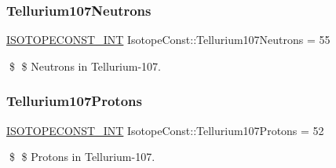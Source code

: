 \subsubsection{\texorpdfstring{Tellurium107\+Neutrons}{Tellurium107Neutrons}}
{\footnotesize\ttfamily \mbox{\hyperlink{group___isotope_const-_macros_ga5f18360b3e99483a35c32d789e62621c}{I\+S\+O\+T\+O\+P\+E\+C\+O\+N\+S\+T\+\_\+\+I\+NT}} Isotope\+Const\+::\+Tellurium107\+Neutrons = 55}

\$ \$ Neutrons in Tellurium-\/107. \mbox{\label{group___isotope_const-_tellurium-_te107_gac4f8b073d845bb260dca28fe83b9511e}} 
\subsubsection{\texorpdfstring{Tellurium107\+Protons}{Tellurium107Protons}}
{\footnotesize\ttfamily \mbox{\hyperlink{group___isotope_const-_macros_ga5f18360b3e99483a35c32d789e62621c}{I\+S\+O\+T\+O\+P\+E\+C\+O\+N\+S\+T\+\_\+\+I\+NT}} Isotope\+Const\+::\+Tellurium107\+Protons = 52}

\$ \$ Protons in Tellurium-\/107. 
